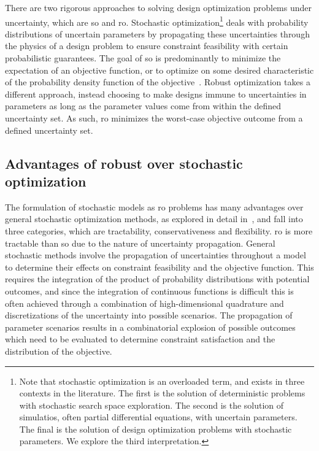 There are two rigorous approaches to solving design optimization problems under uncertainty,
which are \gls{so} and \gls{ro}. Stochastic optimization\footnote{Note that stochastic
optimization is an overloaded term, and exists in three contexts in the literature. The first is the solution
of deterministic problems with stochastic search space exploration. The second is the solution of simulatios,
often partial differential equations, with uncertain parameters. The final is the solution
of design optimization problems with stochastic parameters. We explore the third interpretation.}
deals with probability distributions of
uncertain parameters by propagating these uncertainties through the
physics of a design problem to ensure constraint feasibility with certain probabilistic guarantees.
The goal of \gls{so} is predominantly to minimize the expectation of an objective function, or
to optimize on some desired characteristic of the probability density function of the objective~\cite{Diwekar2008}.
Robust optimization takes a different approach, instead choosing to make designs immune to
uncertainties in parameters as long as the parameter values come from within the defined
uncertainty set. As such, \gls{ro} minimizes the worst-case objective outcome from a defined uncertainty set.

\subsection{Advantages of robust over stochastic optimization}

The formulation of stochastic models as \gls{ro} problems has many advantages
over general stochastic optimization methods, as explored in detail in~\cite{Bertsimas2011},
and fall into three categories, which are tractability, conservativeness and flexibility.
\gls{ro} is more tractable than \gls{so} due to the nature of uncertainty propagation.
General stochastic methods involve the propagation of uncertainties throughout a model
to determine their effects on constraint feasibility and the objective function.
This requires the integration of the product of probability distributions with potential outcomes,
and since the integration of continuous functions is difficult this is often achieved through
a combination of high-dimensional quadrature and discretizations of the uncertainty into
possible scenarios. The propagation of parameter
scenarios results in a combinatorial explosion of possible outcomes which need to be evaluated to determine constraint
satisfaction and the distribution of the objective.

